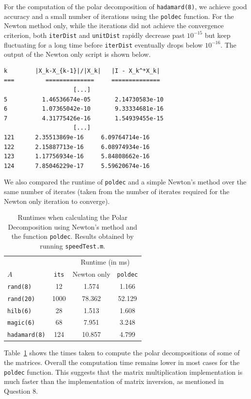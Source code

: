 \documentclass[10pt, A4paper]{article}
\begin{document}
For the computation of the polar decomposition of \texttt{hadamard(8)}, 
we achieve good accuracy and a small number of iterations using the 
\texttt{poldec} function. For the Newton method only, while the 
iterations did not achieve the convergence criterion, both 
\texttt{iterDist} and \texttt{unitDist} rapidly decrease past 
$10^{-15}$ but keep fluctuating for a long time before 
\texttt{iterDist} eventually drops below $10^{-16}$. The output of the 
Newton only script is shown below.
\begin{verbatim}
k   	 |X_k-X_{k-1}|/|X_k|   |I - X_k^*X_k|
=== 	    ==============     ==============
                    [...]
5	       1.46536674e-05	    2.14730583e-10
6	       1.07365042e-10	    9.33334681e-16
7	       4.31775426e-16	    1.54939455e-15
                    [...]
121	     2.35513869e-16	    6.09764714e-16
122	     2.15887713e-16	    6.08974934e-16
123      1.17756934e-16	    5.84808662e-16
124      7.85046229e-17	    5.59620674e-16
\end{verbatim}

We also compared the runtime of \texttt{poldec} and a simple Newton's 
method over the same number of iterates (taken from the number of 
iterates required for the Newton only iteration to converge).
\begin{table}[t]
	\centering
	\begin{tabular}{ l c c c }
		\toprule
		& &\multicolumn{2}{c}{Runtime (in ms)} \\
		\cmidrule(lr){3-4}
		$A$ & \texttt{its} & Newton only & \texttt{poldec} \\
		\midrule
		\texttt{rand(8)}     & 12   & 1.574  & 1.166  \\
		\texttt{rand(20)}    & 1000 & 78.362 & 52.129 \\
		\texttt{hilb(6)}     & 28   & 1.513  & 1.608  \\
		\texttt{magic(6)}    & 68   & 7.951  & 3.248  \\
		\texttt{hadamard(8)} & 124  & 10.857 & 4.799  \\
		\bottomrule
	\end{tabular}
	\caption{
	Runtimes when calculating the Polar Decomposition using 
	Newton's method and the function \texttt{poldec}. Results obtained 
	by running \texttt{speedTest.m}.
	\label{tab:runtimes}}
\end{table}
Table~\ref{tab:runtimes} shows the times taken to compute the polar 
decompositions of some of the matrices. Overall the computation time 
remains lower in most cases for the \texttt{poldec} function.
This suggests that the matrix multiplication implementation is 
much faster than the implementation of matrix inversion, as mentioned 
in Question 8.
\end{document}

